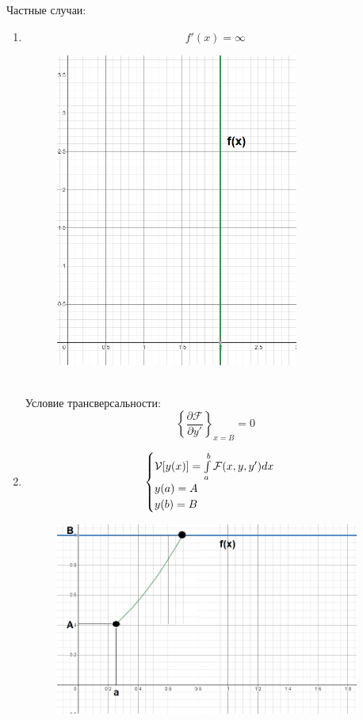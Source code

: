 Частные случаи:
\begin{enumerate}
    \item $$f'(x)= \infty$$
          \begin{figure}[h!]
            \begin{center}
              \includegraphics[width = 8cm]{Math/infty_border_func.png}
            \end{center}
          \end{figure}
          \\
          Условие трансверсальности:
          $$\left\{\frac{\partial\mathcal{F}}{\partial y'}\right\}_{x=B}=0$$
    \item 
      \begin{equation*}
        \begin{cases}
          $$\mathcal{V}[y(x)]=\int\limits_{a}^{b}\mathcal{F}(x,y,y')dx$$\\
          $$y(a)=A$$\\
          $$y(b)=B$$
        \end{cases}
      \end{equation*}
      
      \begin{figure}[h!]
        \begin{center}
          \includegraphics[width = 10cm]{Math/option_b.png}
        \end{center}
      \end{figure}
      

\end{enumerate}
